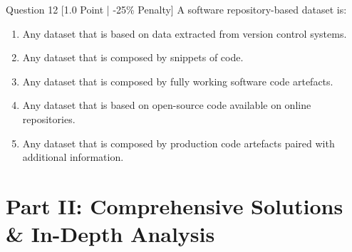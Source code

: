 \documentclass[11pt,a4paper]{article}
\begin{document}
\begin{questionbox}{Question 12 \hfill [1.0 Point | -25\% Penalty]}
A software repository-based dataset is:
\begin{enumerate}[label=(\alph*)]
    \item Any dataset that is based on data extracted from version control systems.
    \item Any dataset that is composed by snippets of code.
    \item Any dataset that is composed by fully working software code artefacts.
    \item Any dataset that is based on open-source code available on online repositories.
    \item Any dataset that is composed by production code artefacts paired with additional information.
\end{enumerate}
\end{questionbox}

\newpage

\section{Part II: Comprehensive Solutions \& In-Depth Analysis}
\end{document}
